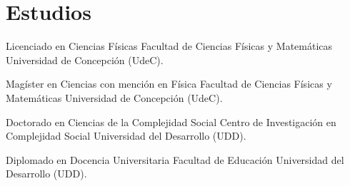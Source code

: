 \section{Estudios}
            {Licenciado en Ciencias Físicas}
            {Facultad de Ciencias Físicas y Matemáticas}
            {Universidad de Concepción (UdeC).}
            {}
            {} 

    \vspace{8pt}
    
            {Magíster en Ciencias con mención en Física}
            {Facultad de Ciencias Físicas y Matemáticas}
            {Universidad de Concepción (UdeC).}
            {}
            {}
            
    \vspace{8pt}
    
            {Doctorado en Ciencias de la Complejidad Social}
            {Centro de Investigación en Complejidad Social}
            {Universidad del Desarrollo (UDD).}
            {}
            {}

    \vspace{8pt}

            {Diplomado en Docencia Universitaria}
            {Facultad de Educación}
            {Universidad del Desarrollo (UDD).}
            {}
            {}